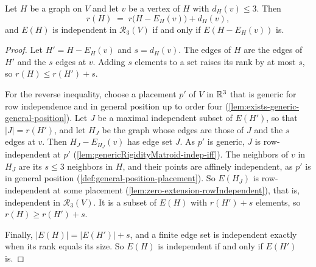 \begin{corollary}
  \label{cor:zero-extension-degree-le-three}
  \leanok
  Let $H$ be a graph on $V$ and let $v$ be a vertex of $H$ with
  $d_H(v) \le 3$. Then
  \[
    r(H) \;=\; r\bigl(H - E_H(v)\bigr) + d_H(v),
  \]
  and $E(H)$ is independent in $\mathcal{R}_3(V)$ if and only if
  $E(H - E_H(v))$ is.
\end{corollary}
\begin{proof}
  \leanok
  Let $H' = H - E_H(v)$ and $s = d_H(v)$. The edges of $H$ are the
  edges of $H'$ and the $s$ edges at $v$. Adding $s$ elements to a set
  raises its rank by at most $s$, so $r(H) \le r(H') + s$.

  For the reverse inequality, choose a placement $p'$ of $V$ in ${\mathbb{R}}^3$
  that is generic for row independence and in general position up to
  order four (\cref{lem:exists-generic-general-position}). Let $J$ be a
  maximal independent subset of $E(H')$, so that $|J| = r(H')$, and let
  $H_J$ be the graph whose edges are those of $J$ and the $s$ edges at
  $v$. Then $H_J - E_{H_J}(v)$ has edge set $J$. As $p'$ is generic,
  $J$ is row-independent at $p'$
  (\cref{lem:genericRigidityMatroid-indep-iff}). The neighbors of $v$ in
  $H_J$ are its $s \le 3$ neighbors in $H$, and their points are
  affinely independent, as $p'$ is in general position
  (\cref{def:general-position-placement}). So $E(H_J)$ is
  row-independent at some placement
  (\cref{lem:zero-extension-rowIndependent}), that is, independent in
  $\mathcal{R}_3(V)$. It is a subset of $E(H)$ with $r(H') + s$
  elements, so $r(H) \ge r(H') + s$.

  Finally, $|E(H)| = |E(H')| + s$, and a finite edge set is independent
  exactly when its rank equals its size. So $E(H)$ is independent if and
  only if $E(H')$ is.
\end{proof}

